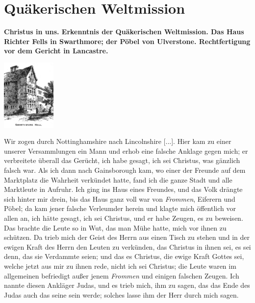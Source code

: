 
\chapter[Quäkerischen Weltmission]{Quäkerischen Weltmission}

\begin{center}
\textbf{Christus in uns. Erkenntnis der Quäkerischen Weltmission. Das
Haus Richter Fells in Swarthmore; der Pöbel 
von Ulverstone.
Rechtfertigung vor dem Gericht in Lancastre.}
\end{center}



\begin{floatingfigure}[3]{4cm}
\includegraphics[width=0.20\textwidth]{./pics/swarthmore_hall.png}
\label{bild:swarthmoor} 
\end{floatingfigure}



Wir zogen durch Nottinghamshire 
nach Lincolnshire [...].
Hier kam zu einer unserer Versammlungen ein Mann und erhob eine
falsche Anklage gegen mich; er verbreitete 
überall das Gerücht, ich
habe gesagt, ich sei Christus, was gänzlich falsch war. Als ich dann
nach Gainsborough kam, wo einer 
der Freunde auf dem Marktplatz die Wahrheit 
verkündet hatte, fand ich die ganze Stadt und
alle Marktleute in Aufruhr. Ich ging ins Haus eines Freundes,
und das Volk drängte sich hinter mir drein, bis das Haus ganz
voll war von \textit{Frommen}, Eiferern und Pöbel; da kam jener
falsche Verleumder herein und klagte mich öffentlich vor allen an,
ich hätte gesagt, ich sei Christus, und er habe Zeugen, es zu 
beweisen. Das brachte die Leute so in Wut, das man Mühe hatte,
mich vor ihnen zu schützen. Da trieb mich der Geist des Herrn
aus einen Tisch zu stehen und in der ewigen Kraft des Herrn
den Leuten zu verkünden, das Christus in ihnen sei, es sei denn,
das sie Verdammte seien; und das es Christus, die ewige Kraft
Gottes sei, welche jetzt aus mir zu ihnen rede, nicht ich sei Christus;
die Leute waren im allgemeinen befriedigt außer jenem \textit{Frommen}
und einigen falschen Zeugen. Ich nannte diesen Ankläger
Judas,
und es trieb mich, ihm zu sagen, das das Ende des Judas auch
das seine sein werde; solches lasse ihm der Herr durch mich sagen.


